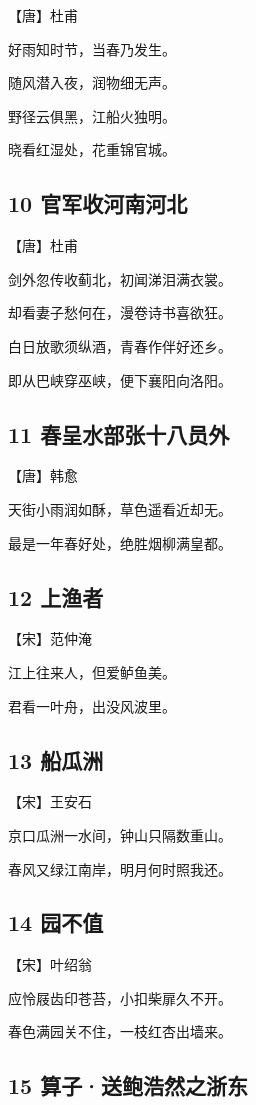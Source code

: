 \documentclass[a6paper, 12pt]{article}
\begin{document}
【唐】杜甫

好雨知时节，当春乃发生。

随风潜入夜，润物细无声。

野径云俱黑，江船火独明。

晓看红湿处，花重锦官城。

\subsection*{10 官军收河南河北}

【唐】杜甫

剑外忽传收蓟北，初闻涕泪满衣裳。

却看妻子愁何在，漫卷诗书喜欲狂。

白日放歌须纵酒，青春作伴好还乡。

即从巴峡穿巫峡，便下襄阳向洛阳。

\subsection*{11 春呈水部张十八员外}

【唐】韩愈

天街小雨润如酥，草色遥看近却无。

最是一年春好处，绝胜烟柳满皇都。

\subsection*{12 上渔者}

【宋】范仲淹

江上往来人，但爱鲈鱼美。

君看一叶舟，出没风波里。

\subsection*{13 船瓜洲}

【宋】王安石

京口瓜洲一水间，钟山只隔数重山。

春风又绿江南岸，明月何时照我还。

\subsection*{14 园不值}

【宋】叶绍翁

应怜屐齿印苍苔，小扣柴扉久不开。

春色满园关不住，一枝红杏出墙来。

\subsection*{15 算子·送鲍浩然之浙东}
\end{document}
